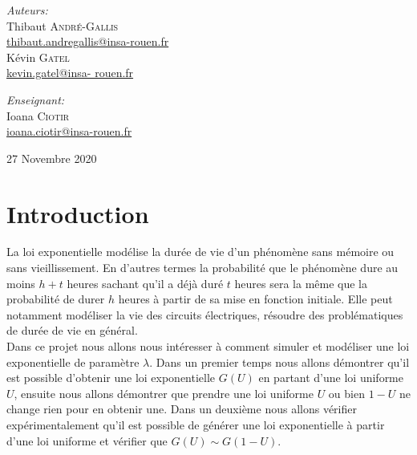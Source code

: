 \documentclass[12,french]{report}
\begin{document}
\begin{titlepage}
\begin{center}
	\begin{minipage}{0.4\textwidth}
		\begin{flushleft} \large
			\emph{Auteurs:}\\
			Thibaut \textsc{André-Gallis} \\
			{\small\href{mailto:thibaut.andregallis@insa-rouen.fr}{thibaut.andregallis@insa-rouen.fr}} \\
			Kévin \textsc{Gatel} \\
			{\small\href{mailto:kevin.gatel@insa-rouen.fr}{kevin.gatel@insa-				rouen.fr}}
		\end{flushleft}
	\end{minipage}
	\begin{minipage}{0.4\textwidth}
		\begin{flushright} \large
			\emph{Enseignant:} \\
			Ioana \textsc{Ciotir} \\
			{\small\href{mailto:ioana.ciotir@insa-rouen.fr}								{ioana.ciotir@insa-rouen.fr}}
		\end{flushright}
	\end{minipage}

	\vfill
	{\large 27 Novembre 2020}
\end{center}
\end{titlepage}

\tableofcontents


\renewcommand{\chaptername}{}
\chapter*{Introduction}

La loi exponentielle modélise la durée de vie d'un phénomène sans mémoire ou sans vieillissement. En d'autres termes la probabilité que le phénomène dure au moins $h+t$ heures sachant qu'il a déjà duré $t$ heures sera la même que la probabilité de durer $h$ heures à partir de sa mise en fonction initiale. Elle peut notamment modéliser la vie des circuits électriques, résoudre des problématiques de durée de vie en général.\\

Dans ce projet nous allons nous intéresser à comment simuler et modéliser une loi exponentielle de paramètre $\lambda$. Dans un premier temps nous allons démontrer qu'il est possible d'obtenir une loi exponentielle $G(U)$ en partant d'une loi uniforme $U$, ensuite nous allons démontrer que prendre une loi uniforme $U$ ou bien $1-U$ ne change rien pour en obtenir une. Dans un deuxième nous allons vérifier expérimentalement qu'il est possible de générer une loi exponentielle à partir d'une loi uniforme et vérifier que $G(U) \sim G(1-U)$.
\end{document}
